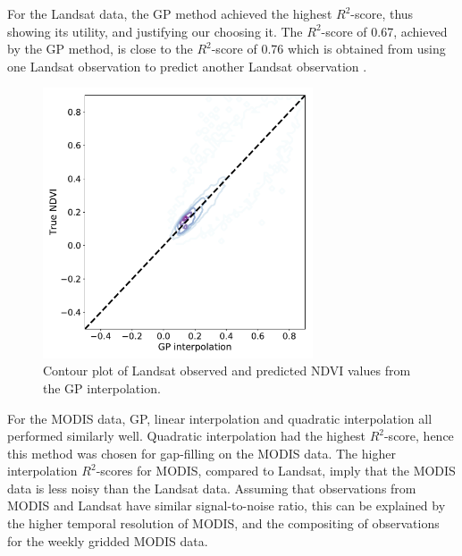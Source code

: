 \documentclass[review]{elsarticle}
\begin{document}
For the Landsat data, the GP method achieved the highest $R^2$-score, thus showing its utility, and justifying our choosing it. The $R^2$-score of 0.67, achieved by the GP method, is close to the $R^2$-score of 0.76 which is obtained from using one Landsat observation to predict another Landsat observation . 

\begin{figure} 
	\centering
	\includegraphics[trim = 30mm 5mm 5mm 15mm,width=8cm]{figures/interp_GP.pdf}
	\caption{Contour plot of Landsat observed and predicted NDVI values from the GP interpolation.} \label{fig:interp_GP}
\end{figure}





For the MODIS data, GP, linear interpolation and quadratic interpolation all performed similarly well. Quadratic interpolation had the highest $R^2$-score, hence this method was chosen for gap-filling on the MODIS data. The higher interpolation $R^2$-scores for MODIS, compared to Landsat, imply that the MODIS data is less noisy than the Landsat data. Assuming that observations from MODIS and Landsat have similar signal-to-noise ratio, this can be explained by the higher temporal resolution of MODIS, and the compositing of  observations for the weekly gridded MODIS data. 
\end{document}
